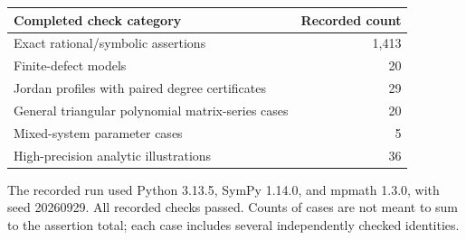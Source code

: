 \begin{center}\small
\begin{tabular}{lr}\toprule
Completed check category & Recorded count\\\midrule
Exact rational/symbolic assertions & 1,413\\
Finite-defect models & 20\\
Jordan profiles with paired degree certificates & 29\\
General triangular polynomial matrix-series cases & 20\\
Mixed-system parameter cases & 5\\
High-precision analytic illustrations & 36\\
\bottomrule\end{tabular}\end{center}
The recorded run used Python 3.13.5, SymPy 1.14.0, and mpmath 1.3.0, with seed 20260929. All recorded checks passed. Counts of cases are not meant to sum to the assertion total; each case includes several independently checked identities.

